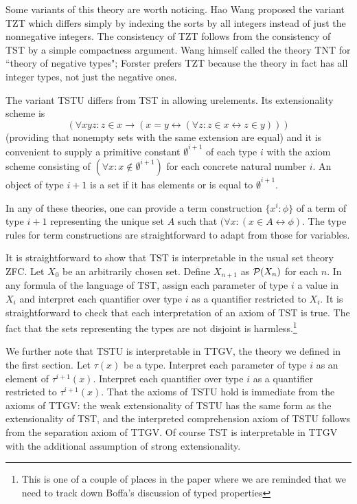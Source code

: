 \documentclass[12pt]{article}
\begin{document}
Some variants of this theory are worth noticing.  Hao Wang proposed the variant TZT which differs simply by indexing the sorts by all integers instead of just the nonnegative integers.  The consistency of TZT follows from the consistency of TST by a simple compactness argument.  Wang himself called the theory TNT for ``theory of negative types";  Forster prefers TZT because the theory in fact has all integer types, not just the negative ones.

The variant TSTU differs from TST in allowing urelements.  Its extensionality scheme is $$(\forall xyz:z\in x \rightarrow(x=y \leftrightarrow (\forall z:z\in x \leftrightarrow z \in y)))$$ (providing that nonempty sets with the same extension are equal) and it is convenient to supply a primitive constant $\emptyset^{i+1}$ of each type $i$ with the axiom scheme consisting of $(\forall x:x \not\in \emptyset^{i+1})$ for each concrete natural number $i$.  An object of type $i+1$ is a set if it has elements or is equal to $\emptyset^{i+1}$.

In any of these theories, one can provide a term construction $\{x^i:\phi\}$ of a term of type $i+1$ representing the unique set $A$ such that $(\forall x:(x \in A \leftrightarrow \phi)$.  The type rules for term constructions are straightforward to adapt from those for variables.

It is straightforward to show that TST is interpretable in the usual set theory ZFC.  Let $X_0$ be an arbitrarily chosen set. Define $X_{n+1}$ as ${\cal P}(X_n)$ for each $n$.  In any formula of the language of TST, assign each parameter
of type $i$ a value in $X_i$ and interpret each quantifier over type $i$ as a quantifier restricted to $X_i$.  It is straightforward to check that each interpretation of an axiom of TST is true.   The fact that the sets representing the types are not disjoint is harmless.\footnote{This is one of a couple of places in the paper where we are reminded that we need to track down Boffa's discussion of typed properties}

We further note that TSTU is interpretable in TTGV, the theory we defined in the first section.  Let $\tau(x)$ be a type.  Interpret each parameter of type $i$ as an element of $\tau^{i+1}(x)$.  Interpret each quantifier over type $i$ as a quantifier restricted to $\tau^{i+1}(x)$.  That the axioms of TSTU hold is immediate from the axioms of TTGV:  the weak extensionality of TSTU has the same form as the extensionality of TST, and the interpreted comprehension axiom of TSTU follows from
the separation axiom of TTGV.  Of course TST is interpretable in TTGV with the additional assumption of strong extensionality.
\end{document}
